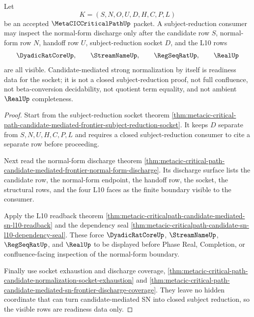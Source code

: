 \begin{theorem}
\label{thm:metacic-criticalpath-subject-reduction-socket-readiness}
Let
$$
K=(S,N,O,U,D,H,C,P,L)
$$
be an accepted $\MetaCICCriticalPathUp$ packet. A subject-reduction consumer may inspect the normal-form discharge only after the candidate row $S$, normal-form row $N$, handoff row $U$, subject-reduction socket $D$, and the L10 rows
$$
\DyadicRatCoreUp,\qquad
\StreamNameUp,\qquad
\RegSeqRatUp,\qquad
\RealUp
$$
are all visible. Candidate-mediated strong normalization by itself is readiness data for the socket; it is not a closed subject-reduction proof, not full confluence, not beta-conversion decidability, not quotient term equality, and not ambient $\RealUp$ completeness.
\end{theorem}
\begin{proof}
Start from the subject-reduction socket theorem \autoref{thm:metacic-critical-path-candidate-mediated-frontier-subject-reduction-socket}. It keeps $D$ separate from $S,N,U,H,C,P,L$ and requires a closed subject-reduction consumer to cite a separate row before proceeding.

Next read the normal-form discharge theorem \autoref{thm:metacic-critical-path-candidate-mediated-frontier-normal-form-discharge}. Its discharge surface lists the candidate row, the normal-form endpoint, the handoff row, the socket, the structural rows, and the four L10 faces as the finite boundary visible to the consumer.

Apply the L10 readback theorem \autoref{thm:metacic-criticalpath-candidate-mediated-sn-l10-readback} and the dependency seal \autoref{thm:metacic-criticalpath-candidate-sn-l10-dependency-seal}. These force $\DyadicRatCoreUp$, $\StreamNameUp$, $\RegSeqRatUp$, and $\RealUp$ to be displayed before Phase Real, Completion, or confluence-facing inspection of the normal-form boundary.

Finally use socket exhaustion and discharge coverage, \autoref{thm:metacic-critical-path-candidate-normalization-socket-exhaustion} and \autoref{thm:metacic-critical-path-candidate-mediated-sn-frontier-discharge-coverage}. They leave no hidden coordinate that can turn candidate-mediated SN into closed subject reduction, so the visible rows are readiness data only.
\end{proof}

